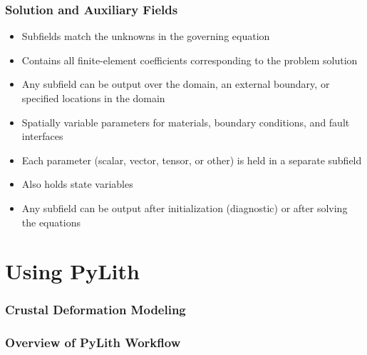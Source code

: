 \documentclass[aspectratio=169]{beamer}
\begin{document}
\begin{frame}
  \frametitle{Solution and Auxiliary Fields}
  \summary{}

  \begin{itemize}
    \begin{itemize}
    \item Subfields match the unknowns in the governing equation
    \item Contains all finite-element coefficients corresponding to the problem solution
    \item Any subfield can be output over the domain, an external boundary, or specified locations in the domain
    \end{itemize}\pause
    \begin{itemize}
    \item Spatially variable parameters for materials, boundary conditions, and fault interfaces
    \item Each parameter (scalar, vector, tensor, or other) is held in a separate subfield
    \item Also holds state variables
    \item Any subfield can be output after initialization (diagnostic) or after solving the equations
    \end{itemize}
  \end{itemize}

\end{frame}


\section{Using PyLith}

\begin{frame}
  \frametitle{Crustal Deformation Modeling}

  
\end{frame}


\begin{frame}
  \frametitle{Overview of PyLith Workflow}
  \summary{}

\end{frame}
\end{document}

